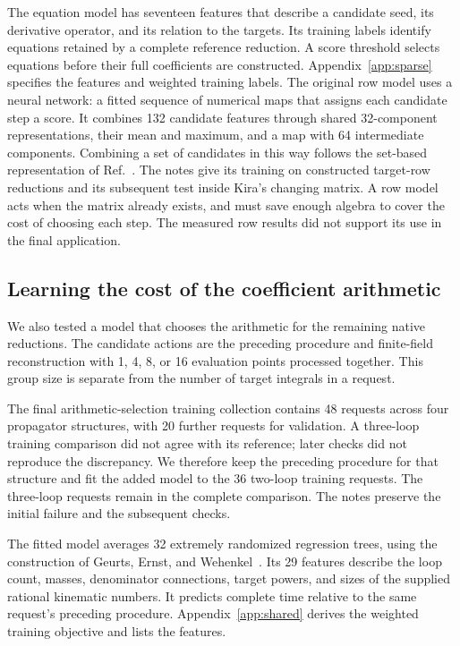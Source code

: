 The equation model has seventeen features that describe a candidate seed, its derivative operator, and its relation to the targets. Its training labels identify equations retained by a complete reference reduction. A score threshold selects equations before their full coefficients are constructed. Appendix~\ref{app:sparse} specifies the features and weighted training labels. The original row model uses a neural network: a fitted sequence of numerical maps that assigns each candidate step a score. It combines 132 candidate features through shared 32-component representations, their mean and maximum, and a map with 64 intermediate components. Combining a set of candidates in this way follows the set-based representation of Ref.~\cite{DeepSets}. The notes give its training on constructed target-row reductions and its subsequent test inside Kira's changing matrix. A row model acts when the matrix already exists, and must save enough algebra to cover the cost of choosing each step. The measured row results did not support its use in the final application.

\subsection{Learning the cost of the coefficient arithmetic}
We also tested a model that chooses the arithmetic for the remaining native reductions. The candidate actions are the preceding procedure and finite-field reconstruction with 1, 4, 8, or 16 evaluation points processed together. This group size is separate from the number of target integrals in a request.

The final arithmetic-selection training collection contains 48 requests across four propagator structures, with 20 further requests for validation. A three-loop training comparison did not agree with its reference; later checks did not reproduce the discrepancy. We therefore keep the preceding procedure for that structure and fit the added model to the 36 two-loop training requests. The three-loop requests remain in the complete comparison. The notes preserve the initial failure and the subsequent checks.

The fitted model averages 32 extremely randomized regression trees, using the construction of Geurts, Ernst, and Wehenkel~\cite{Geurts2006ExtraTrees}. Its 29 features describe the loop count, masses, denominator connections, target powers, and sizes of the supplied rational kinematic numbers. It predicts complete time relative to the same request's preceding procedure. Appendix~\ref{app:shared} derives the weighted training objective and lists the features.

